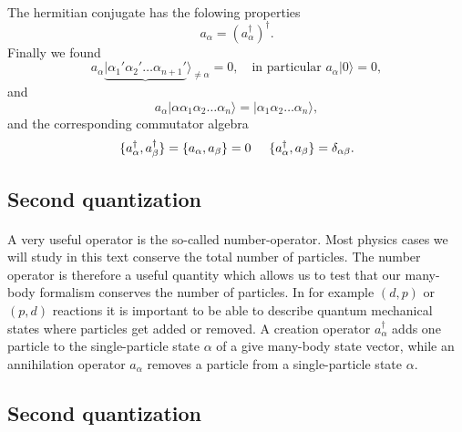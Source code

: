 \documentclass[%
twoside,                 %
final,                   %
10pt]{article}
\begin{document}
\paragraph{}
The hermitian conjugate has the folowing properties
\[
        a_{\alpha} = ( a_{\alpha}^{\dagger} )^{\dagger}.
\]
Finally we found 
\[
	a_\alpha\underbrace{|\alpha_1'\alpha_2' \dots \alpha_{n+1}'}\rangle_{\neq \alpha} = 0, \quad
		\textrm{in particular } a_\alpha |0\rangle = 0,
\]
and
\[
 a_\alpha |\alpha\alpha_1\alpha_2 \dots \alpha_{n}\rangle = |\alpha_1\alpha_2 \dots \alpha_{n}\rangle,
\]
and the corresponding commutator algebra
\[
	\{a_{\alpha}^{\dagger},a_{\beta}^{\dagger}\} = \{a_{\alpha},a_{\beta}\} = 0 \hspace{0.5cm} 
\{a_\alpha^{\dagger},a_\beta \} = \delta_{\alpha\beta}.
\]




\subsection{Second quantization}

\paragraph{}
A very useful operator is the so-called number-operator.  Most physics cases  we will
study in this text conserve the total number of particles.  The number operator is therefore
a useful quantity which allows us to test that our many-body formalism  conserves the number of particles.
In for example $(d,p)$ or $(p,d)$ reactions it is important to be able to describe quantum mechanical states
where particles get added or removed.
A creation operator $a_\alpha^{\dagger}$ adds one particle to the single-particle state
$\alpha$ of a give many-body state vector, while an annihilation operator $a_\alpha$ 
removes a particle from a single-particle
state $\alpha$.





\subsection{Second quantization}

\end{document}
